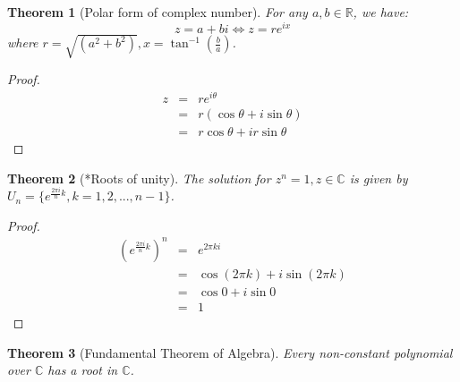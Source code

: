 \documentclass{article}
\theoremstyle{MyNonumberplain}
\theoremstyle{break}
\newtheorem*{proof}{Proof. }
\newcommand{\R}{\mathbb{R}}
\newcommand{\C}{\mathbb{C}}
\theoremstyle{break}
\newtheorem{theorem}{Theorem}[section]
\theoremstyle{break}
\theoremstyle{definition}
\theoremstyle{break}
\begin{document}
\begin{thmbox}
    \begin{theorem}[Polar form of complex number]
        For any $a,b\in\R$, we have:
            $$z=a+bi \iff z=re^{ix}$$
        where $r=\sqrt{(a^2+b^2)},x=\tan^{-1}(\frac{b}{a})$.
    \end{theorem}
    \begin{prfbox}
        \begin{proof}
            \begin{eqnarray}
                z & = & r e^{i \theta} \nonumber\\
                  & = & r (\cos \theta + i \sin \theta)\nonumber\\
                  & = & r \cos \theta + i r \sin \theta\nonumber
              \end{eqnarray}
        \end{proof}
    \end{prfbox}
    
\end{thmbox}

\begin{thmbox}
    \begin{theorem}[*Roots of unity]
        The solution for $z^n=1,z\in\C$ is given by $U_n=\{e^{\frac{2\pi i}{n}k}, k=1,2,...,n-1\}$.
    \end{theorem}
    \begin{prfbox}
        \begin{proof}
            \begin{eqnarray}
                \left( e^{\frac{2 \pi i}{n} k} \right)^n & = & e^{2 \pi k i}\nonumber\\
                & = & \cos (2 \pi k) + i \sin (2 \pi k)\nonumber\\
                & = & \cos 0 + i \sin 0\nonumber\\
                & = & 1 \nonumber
            \end{eqnarray}
        \end{proof}
    \end{prfbox}    
\end{thmbox}


\begin{thmbox}
    \begin{theorem}[Fundamental Theorem of Algebra]
        Every non-constant polynomial over $\mathbb{C}$ has a root in $\mathbb{C}$.
    \end{theorem}
\end{thmbox}
\end{document}
